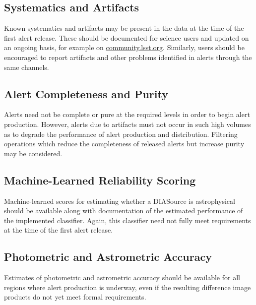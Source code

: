 \documentclass[OPS,authoryear,toc]{lsstdoc}
\begin{document}
\subsection{Systematics and Artifacts}


Known systematics and artifacts may be present in the data at the time of the first alert release.
These should be documented for science users and updated on an ongoing basis, for example on \url{community.lsst.org}.
Similarly, users should be encouraged to report artifacts and other problems identified in alerts through the same channels.

\subsection{Alert Completeness and Purity}

Alerts need not be complete or pure at the required levels in order to begin alert production.
However, alerts due to artifacts must not occur in such high volumes as to degrade the performance of alert production and distribution.
Filtering operations which reduce the completeness of released alerts but increase purity may be considered.


\subsection{Machine-Learned Reliability Scoring}

Machine-learned scores for estimating whether a DIASource is astrophysical should be available along with documentation of the estimated performance of the implemented classifier.  
Again, this classifier need not fully meet requirements at the time of the first alert release.

\subsection{Photometric and Astrometric Accuracy}


Estimates of photometric and astrometric accuracy should be available for all regions where alert production is underway, even if the resulting difference image products do not yet meet formal requirements.
\end{document}
